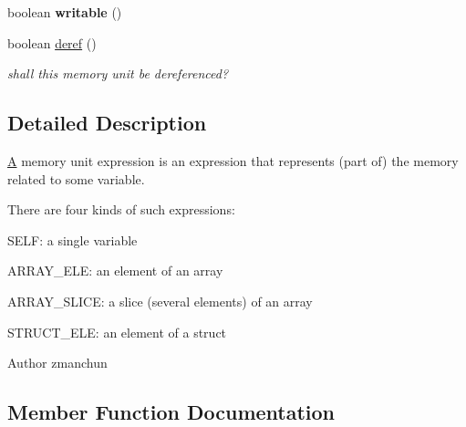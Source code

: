\begin{DoxyCompactItemize}
\item 
\hypertarget{interfaceedu_1_1udel_1_1cis_1_1vsl_1_1civl_1_1model_1_1IF_1_1expression_1_1MemoryUnitExpression_a30ad108c54e899ceee77e621b0134209}{}boolean {\bfseries writable} ()\label{interfaceedu_1_1udel_1_1cis_1_1vsl_1_1civl_1_1model_1_1IF_1_1expression_1_1MemoryUnitExpression_a30ad108c54e899ceee77e621b0134209}

\item 
boolean \hyperlink{interfaceedu_1_1udel_1_1cis_1_1vsl_1_1civl_1_1model_1_1IF_1_1expression_1_1MemoryUnitExpression_a136969d68bacdbf93e4da964df85191b}{deref} ()
\begin{DoxyCompactList}\small\item\em shall this memory unit be dereferenced? \end{DoxyCompactList}\end{DoxyCompactItemize}


\subsection{Detailed Description}
\hyperlink{structA}{A} memory unit expression is an expression that represents (part of) the memory related to some variable. 

There are four kinds of such expressions\+: 
\begin{DoxyItemize}
\item S\+E\+L\+F\+: a single variable 
\item A\+R\+R\+A\+Y\+\_\+\+E\+L\+E\+: an element of an array 
\item A\+R\+R\+A\+Y\+\_\+\+S\+L\+I\+C\+E\+: a slice (several elements) of an array 
\item S\+T\+R\+U\+C\+T\+\_\+\+E\+L\+E\+: an element of a struct 
\end{DoxyItemize}

\begin{DoxyAuthor}{Author}
zmanchun 
\end{DoxyAuthor}


\subsection{Member Function Documentation}
\hypertarget{interfaceedu_1_1udel_1_1cis_1_1vsl_1_1civl_1_1model_1_1IF_1_1expression_1_1MemoryUnitExpression_a136969d68bacdbf93e4da964df85191b}{}
